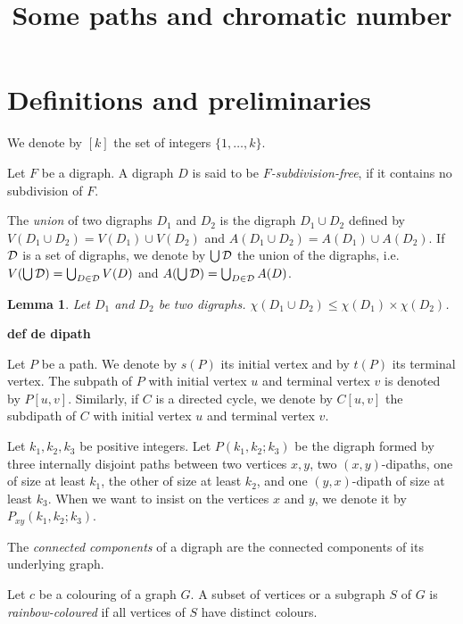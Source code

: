 \documentclass[utf8,11pt]{article}
\title{Some paths and chromatic number}
\theoremstyle{plain}
\newtheorem{lemma}[theorem]{Lemma}
\theoremstyle{definition}
\theoremstyle{remark}
\begin{document}
\maketitle

\section{Definitions and preliminaries}


We denote by $[k]$ the set of integers $\{1, \dots , k\}$.

Let $F$ be a digraph.
A digraph $D$ is said to be {\it $F$-subdivision-free}, if it contains no subdivision of $F$.

The {\it union} of two digraphs $D_1$ and $D_2$ is the digraph  $D_1\cup D_2$ defined by $V(D_1\cup D_2) = V(D_1)\cup V(D_2)$ and 
$A(D_1\cup D_2) = A(D_1)\cup A(D_2)$.
If ${\cal D}$ is a set of digraphs, we denote by $\bigcup {\cal D}$ the union of the digraphs, i.e. $V(\bigcup {\cal D}) =\bigcup_{D\in {\cal D}} V(D)$
and $A(\bigcup {\cal D}) =\bigcup_{D\in {\cal D}} A(D)$.

\begin{lemma}\label{lem:decomp}
Let $D_1$ and $D_2$ be two digraphs.
$\chi(D_1\cup D_2) \leq \chi(D_1)\times \chi(D_2)$.
\end{lemma}



{\bf def de dipath}

Let $P$ be a path. We denote by $s(P)$ its initial vertex and by $t(P)$ its terminal vertex.
The subpath of $P$ with initial vertex $u$ and terminal vertex $v$ is denoted by $P[u,v]$.
Similarly, if $C$ is a directed cycle, we denote by $C[u,v]$ the subdipath of $C$ with initial vertex $u$ and terminal vertex $v$.


Let $k_1,k_2,k_3$ be positive integers. Let $P(k_1,k_2;k_3)$ be the digraph formed by three internally disjoint paths between two vertices $x,y$, two $(x,y)$-dipaths, one of size at least $k_1$, the other of size at least $k_2$, and one $(y,x)$-dipath of size at least $k_3$.
When we want to insist on the vertices $x$ and $y$, we denote it by $P_{xy}(k_1,k_2;k_3)$.


The {\it connected components} of a digraph are the connected components of its underlying graph.

Let $c$ be a colouring of a graph $G$. A subset of vertices or a subgraph $S$ of $G$ is {\it rainbow-coloured} if all vertices of $S$ have distinct colours.
\end{document}
